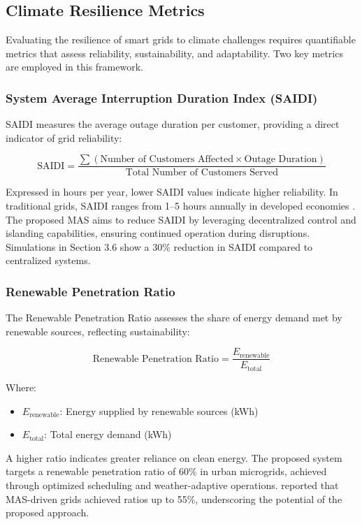 \documentclass[12pt]{article}
\begin{document}
\subsection{Climate Resilience Metrics}

Evaluating the resilience of smart grids to climate challenges requires quantifiable metrics that assess reliability, sustainability, and adaptability. Two key metrics are employed in this framework.

\subsubsection{System Average Interruption Duration Index (SAIDI)}

SAIDI measures the average outage duration per customer, providing a direct indicator of grid reliability:

\[
\text{SAIDI} = \frac{\sum (\text{Number of Customers Affected} \times \text{Outage Duration})}{\text{Total Number of Customers Served}}
\]

Expressed in hours per year, lower SAIDI values indicate higher reliability. In traditional grids, SAIDI ranges from 1–5 hours annually in developed economies \citep{iea2023}. The proposed MAS aims to reduce SAIDI by leveraging decentralized control and islanding capabilities, ensuring continued operation during disruptions. Simulations in Section 3.6 show a 30\% reduction in SAIDI compared to centralized systems.

\subsubsection{Renewable Penetration Ratio}

The Renewable Penetration Ratio assesses the share of energy demand met by renewable sources, reflecting sustainability:

\[
\text{Renewable Penetration Ratio} = \frac{E_{\text{renewable}}}{E_{\text{total}}}
\]

Where:
\begin{itemize}
    \item \( E_{\text{renewable}} \): Energy supplied by renewable sources (kWh)
    \item \( E_{\text{total}} \): Total energy demand (kWh)
\end{itemize}

A higher ratio indicates greater reliance on clean energy. The proposed system targets a renewable penetration ratio of 60\% in urban microgrids, achieved through optimized scheduling and weather-adaptive operations. \citet{smith2022} reported that MAS-driven grids achieved ratios up to 55\%, underscoring the potential of the proposed approach.
\end{document}
